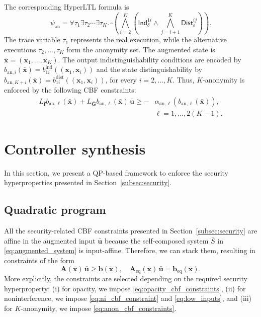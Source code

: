 \documentclass[journal,twoside,web]{ieeecolor}
\begin{document}
The corresponding HyperLTL formula is
\begin{equation}
\label{eq:hyperltl_anonymity}
    \psi_{\mathrm{an}} = \forall \tau_1 \exists \tau_2 \cdots \exists \tau_K . \, \square \left( \bigwedge_{i=2}^{K} \left( \mathsf{Ind}_{\delta}^{1i} \land \bigwedge_{j = i+1}^K \mathsf{Dist}_{\varepsilon}^{ij} \right) \right).
\end{equation}
The trace variable $\tau_1$ represents the real execution, while the alternative executions $\tau_2,\ldots,\tau_K$ form the anonymity set. The augmented state is $\bar{\mathbf{x}} = (\mathbf{x}_1, \dots, \mathbf{x}_K)$. The output indistinguishability conditions are encoded by $b_{\mathrm{an},i}(\bar{\mathbf{x}}) = b_{1i}^{\mathrm{ind}} \left( (\mathbf{x}_1, \mathbf{x}_i) \right)$ and the state distinguishability by $b_{\mathrm{an},K + i}(\bar{\mathbf{x}}) = b_{1i}^{\mathrm{dist}} \left( (\mathbf{x}_1, \mathbf{x}_i) \right)$, for every $i=2, \dots, K$. Thus, $K$-anonymity is enforced by the following CBF constraints:
\begin{equation} \label{eq:anon_cbf_constraints}
    \begin{aligned}
        L_{\bar{\mathbf{f}}} b_{\mathrm{an}, \ell}(\bar{\mathbf{x}}) + L_{\bar{\mathbf{G}}} b_{\mathrm{an}, \ell}(\bar{\mathbf{x}}) \, \bar{\mathbf{u}} \ge -&\alpha_{\mathrm{an}, \ell} \left( b_{\mathrm{an}, \ell}(\bar{\mathbf{x}}) \right), \\ 
        &\ell = 1, \dots, 2(K - 1).
    \end{aligned}
\end{equation}

\section{Controller synthesis}
\label{sec:control}

In this section, we present a QP-based framework to enforce the security hyperproperties presented in Section~\ref{subsec:security}.

\subsection{Quadratic program}

All the security-related CBF constraints presented in Section~\ref{subsec:security} are affine in the augmented input $\bar{\mathbf{u}}$ because the self-composed system $\bar{S}$ in \eqref{eq:augmented_system} is input-affine. Therefore, we can stack them, resulting in constraints of the form  
\[
    \mathbf{A} (\bar{\mathbf{x}}) \, \bar{\mathbf{u}} \ge \mathbf{b} (\bar{\mathbf{x}}), \quad \mathbf{A}_\mathrm{eq} (\bar{\mathbf{x}}) \, \bar{\mathbf{u}} = \mathbf{b}_\mathrm{eq} (\bar{\mathbf{x}}).
\]
More explicitly, the constraints are selected depending on the required security hyperproperty: (i) for opacity, we impose \eqref{eq:opacity_cbf_constraints}, (ii) for noninterference, we impose \eqref{eq:ni_cbf_constraint} and \eqref{eq:low_inputs}, and (iii) for $K$-anonymity, we impose \eqref{eq:anon_cbf_constraints}.
\end{document}
